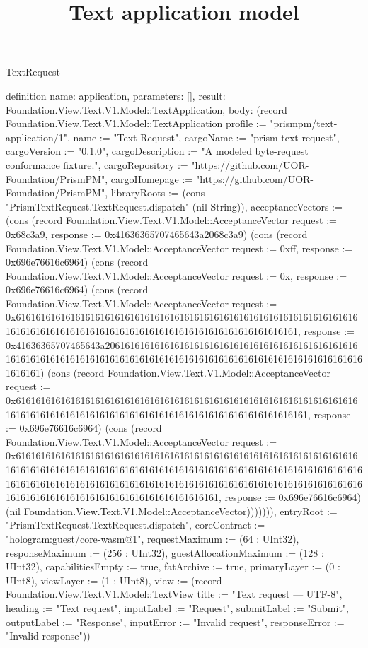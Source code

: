 \begin{lexlean}{TextRequest}
\title{Text application model}
\begin{semanticmodule}
definition{
  name: application,
  parameters: [],
  result: Foundation.View.Text.V1.Model::TextApplication,
  body: (record Foundation.View.Text.V1.Model::TextApplication {profile := "prismpm/text-application/1", name := "Text Request", cargoName := "prism-text-request", cargoVersion := "0.1.0", cargoDescription := "A modeled byte-request conformance fixture.", cargoRepository := "https://github.com/UOR-Foundation/PrismPM", cargoHomepage := "https://github.com/UOR-Foundation/PrismPM", libraryRoots := (cons "PrismTextRequest.TextRequest.dispatch" (nil String)), acceptanceVectors := (cons (record Foundation.View.Text.V1.Model::AcceptanceVector {request := 0x68c3a9, response := 0x41636365707465643a2068c3a9}) (cons (record Foundation.View.Text.V1.Model::AcceptanceVector {request := 0xff, response := 0x696e76616c6964}) (cons (record Foundation.View.Text.V1.Model::AcceptanceVector {request := 0x, response := 0x696e76616c6964}) (cons (record Foundation.View.Text.V1.Model::AcceptanceVector {request := 0x61616161616161616161616161616161616161616161616161616161616161616161616161616161616161616161616161616161616161616161616161616161, response := 0x41636365707465643a2061616161616161616161616161616161616161616161616161616161616161616161616161616161616161616161616161616161616161616161616161616161}) (cons (record Foundation.View.Text.V1.Model::AcceptanceVector {request := 0x6161616161616161616161616161616161616161616161616161616161616161616161616161616161616161616161616161616161616161616161616161616161, response := 0x696e76616c6964}) (cons (record Foundation.View.Text.V1.Model::AcceptanceVector {request := 0x6161616161616161616161616161616161616161616161616161616161616161616161616161616161616161616161616161616161616161616161616161616161616161616161616161616161616161616161616161616161616161616161616161616161616161616161616161616161616161616161616161616161616161, response := 0x696e76616c6964}) (nil Foundation.View.Text.V1.Model::AcceptanceVector))))))), entryRoot := "PrismTextRequest.TextRequest.dispatch", coreContract := "hologram:guest/core-wasm@1", requestMaximum := (64 : UInt32), responseMaximum := (256 : UInt32), guestAllocationMaximum := (128 : UInt32), capabilitiesEmpty := true, fatArchive := true, primaryLayer := (0 : UInt8), viewLayer := (1 : UInt8), view := (record Foundation.View.Text.V1.Model::TextView {title := "Text request — UTF-8", heading := "Text request", inputLabel := "Request", submitLabel := "Submit", outputLabel := "Response", inputError := "Invalid request", responseError := "Invalid response"})})
}


\end{semanticmodule}
\end{lexlean}
